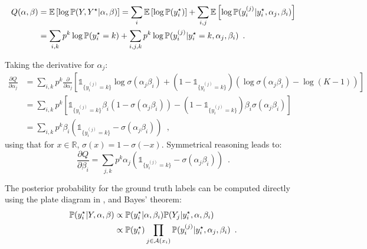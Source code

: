 \begin{align}
    \label{eq:auxi_glad}
    Q(\alpha,\beta) &=  \mathbb{E}\left[\log \mathbb{P}(Y,Y^\star|\alpha,\beta)\right] = \sum_i \mathbb{E}\left[\log \mathbb{P}(y_i^\star)\right] + \sum_{i,j}\mathbb{E}\left[\log \mathbb{P}(y_i^{(j)}|y_i^\star,\alpha_j,\beta_i)\right] \notag\\
    &=\sum_{i,k} p^k\log \mathbb{P}(y_i^\star=k) + \sum_{i,j,k} p^k \log \mathbb{P}(y_i^{(j)}|y_i^\star=k,\alpha_j,\beta_i) \enspace.
\end{align}


Taking the derivative for $\alpha_j$:
\[
\begin{aligned}
\frac{\partial Q}{\partial \alpha_j} &= \sum_{i,k}p^k \frac{\partial}{\partial \alpha_j}\left[\mathds{1}_{\{y_i^{(j)}=k\}}\log \sigma(\alpha_j\beta_i) + \left(1-\mathds{1}_{\{y_i^{(j)}=k\}}\right)\left(\log \sigma(\alpha_j\beta_i) - \log(K-1)\right)\right] \\
&= \sum_{i,k}p^k \left[\mathds{1}_{\{y_i^{(j)}=k\}}\beta_i \left(1-\sigma(\alpha_j\beta_i)\right) - \left(1-\mathds{1}_{\{y_i^{(j)}=k\}}\right) \beta_i\sigma(\alpha_j\beta_i) \right]\\
&= \sum_{i,k}p^k\beta_i\left(\mathds{1}_{\{y_i^{(j)}=k\}} - \sigma(\alpha_j\beta_i)\right) \enspace,
\end{aligned}
\]
using that for $x\in\mathbb{R}$, $\sigma(x) = 1-\sigma(-x)$.
Symmetrical reasoning leads to:
\begin{equation*}
    \frac{\partial Q}{\partial \beta_i} = \sum_{j,k}p^k\alpha_j\left(\mathds{1}_{\{y_i^{(j)}=k\}} - \sigma(\alpha_j\beta_i)\right) \enspace.
\end{equation*}

The posterior probability for the ground truth labels can be computed directly using the plate diagram in ,  and Bayes' theorem:
\begin{align}
    \mathbb{P}(y_i^\star|Y,\alpha,\beta)&\propto \mathbb{P}(y_i^\star|\alpha,\beta_i)\mathbb{P}(Y_j|y_i^\star,\alpha,\beta_i) \notag\\
    &\propto \mathbb{P}(y_i^\star) \prod_{j\in\mathcal{A}(x_i)} \mathbb{P}(y_i^{(j)}|y_i^\star,\alpha_j,\beta_i) \enspace.
\end{align}

